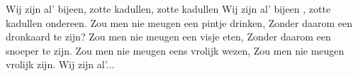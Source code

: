 \beginverse*
Wij zijn al’ bijeen, zotte kadullen, zotte kadullen
Wij zijn al’ bijeen , zotte kadullen ondereen.
Zou men nie meugen een pintje drinken,
Zonder daarom een dronkaard te zijn?
Zou men nie meugen een visje eten,
Zonder daarom een snoeper te zijn.
Zou men nie meugen eens vrolijk wezen,
Zou men nie meugen vrolijk zijn.
\endverse
\beginverse*
Wij zijn al’...
\endverse
\endsong